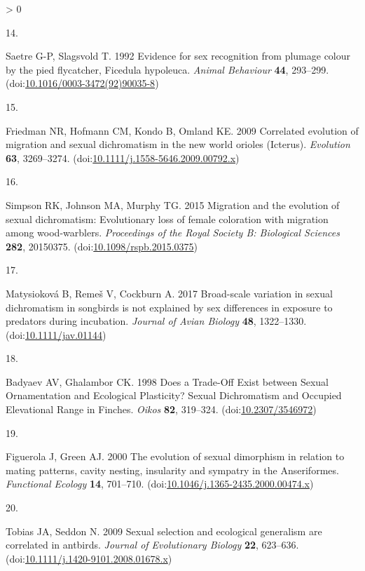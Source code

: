 \documentclass[
  a4paper,
]{article}
\newlength{\cslhangindent}
\newlength{\csllabelwidth}
\newenvironment{CSLReferences}[2] %
 {%
  \setlength{\parindent}{0pt}
  \ifodd #1 \everypar{\setlength{\hangindent}{\cslhangindent}}\ignorespaces\fi
  \ifnum #2 > 0
  \setlength{\parskip}{#2\baselineskip}
  \fi
 }%
 {}
\newcommand{\CSLLeftMargin}[1]{\parbox[t]{\csllabelwidth}{#1}}
\newcommand{\CSLRightInline}[1]{\parbox[t]{\linewidth - \csllabelwidth}{#1}\break}
\begin{document}
\begin{CSLReferences}{0}{0}
\leavevmode\hypertarget{ref-saetre1992}{}%
\CSLLeftMargin{14. }
\CSLRightInline{Saetre G-P, Slagsvold T. 1992 Evidence for sex
recognition from plumage colour by the pied flycatcher, {Ficedula}
hypoleuca. \emph{Animal Behaviour} \textbf{44}, 293--299.
(doi:\href{https://doi.org/10.1016/0003-3472(92)90035-8}{10.1016/0003-3472(92)90035-8})}

\leavevmode\hypertarget{ref-friedman2009}{}%
\CSLLeftMargin{15. }
\CSLRightInline{Friedman NR, Hofmann CM, Kondo B, Omland KE. 2009
Correlated evolution of migration and sexual dichromatism in the new
world orioles ({Icterus}). \emph{Evolution} \textbf{63}, 3269--3274.
(doi:\href{https://doi.org/10.1111/j.1558-5646.2009.00792.x}{10.1111/j.1558-5646.2009.00792.x})}

\leavevmode\hypertarget{ref-simpson2015a}{}%
\CSLLeftMargin{16. }
\CSLRightInline{Simpson RK, Johnson MA, Murphy TG. 2015 Migration and
the evolution of sexual dichromatism: {Evolutionary} loss of female
coloration with migration among wood-warblers. \emph{Proceedings of the
Royal Society B: Biological Sciences} \textbf{282}, 20150375.
(doi:\href{https://doi.org/10.1098/rspb.2015.0375}{10.1098/rspb.2015.0375})}

\leavevmode\hypertarget{ref-matysiokova2017}{}%
\CSLLeftMargin{17. }
\CSLRightInline{Matysioková B, Remeš V, Cockburn A. 2017 Broad-scale
variation in sexual dichromatism in songbirds is not explained by sex
differences in exposure to predators during incubation. \emph{Journal of
Avian Biology} \textbf{48}, 1322--1330.
(doi:\href{https://doi.org/10.1111/jav.01144}{10.1111/jav.01144})}

\leavevmode\hypertarget{ref-badyaev1998}{}%
\CSLLeftMargin{18. }
\CSLRightInline{Badyaev AV, Ghalambor CK. 1998 Does a {Trade}-{Off
Exist} between {Sexual Ornamentation} and {Ecological Plasticity}?
{Sexual Dichromatism} and {Occupied Elevational Range} in {Finches}.
\emph{Oikos} \textbf{82}, 319--324.
(doi:\href{https://doi.org/10.2307/3546972}{10.2307/3546972})}

\leavevmode\hypertarget{ref-figuerola2000}{}%
\CSLLeftMargin{19. }
\CSLRightInline{Figuerola J, Green AJ. 2000 The evolution of sexual
dimorphism in relation to mating patterns, cavity nesting, insularity
and sympatry in the {Anseriformes}. \emph{Functional Ecology}
\textbf{14}, 701--710.
(doi:\href{https://doi.org/10.1046/j.1365-2435.2000.00474.x}{10.1046/j.1365-2435.2000.00474.x})}

\leavevmode\hypertarget{ref-tobias2009}{}%
\CSLLeftMargin{20. }
\CSLRightInline{Tobias JA, Seddon N. 2009 Sexual selection and
ecological generalism are correlated in antbirds. \emph{Journal of
Evolutionary Biology} \textbf{22}, 623--636.
(doi:\href{https://doi.org/10.1111/j.1420-9101.2008.01678.x}{10.1111/j.1420-9101.2008.01678.x})}


\end{CSLReferences}
\end{document}
